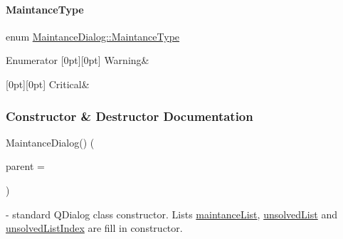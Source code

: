 \paragraph{\texorpdfstring{Maintance\+Type}{MaintanceType}}
{\footnotesize\ttfamily enum \mbox{\hyperlink{classMaintanceDialog_a0774fde5cbe916c333d8d1dd991a3b8f}{Maintance\+Dialog\+::\+Maintance\+Type}}}

\begin{DoxyEnumFields}{Enumerator}
[0pt][0pt]{}\mbox{\label{classMaintanceDialog_a0774fde5cbe916c333d8d1dd991a3b8fa8fe148a4b5ff71d3568fd6aff35d027e}} 
Warning&\\
\hline

[0pt][0pt]{}\mbox{\label{classMaintanceDialog_a0774fde5cbe916c333d8d1dd991a3b8fa56052452a2261539060f7f5433d35d61}} 
Critical&\\
\hline

\end{DoxyEnumFields}


\subsubsection{Constructor \& Destructor Documentation}
\mbox{\label{classMaintanceDialog_a3f541a92622740cce0a8f66e5de506fd}} 
{\footnotesize\ttfamily \texorpdfstring{Maintance\+Dialog()}{MaintanceDialog()}\hspace{0.1cm}{\footnotesize\ttfamily [1/2]} (\begin{DoxyParamCaption}\item[{Q\+Widget $\ast$}]{parent = {} }\end{DoxyParamCaption})\hspace{0.3cm}{\ttfamily [explicit]}} - standard Q\+Dialog class constructor. Lists \hyperlink{classMaintanceDialog_ac4eade50e2d9071c65adf44a2987fab1}{maintance\+List},  \hyperlink{classMaintanceDialog_a37e3caf05435d01f47ed488c39a91587}{unsolved\+List} and \hyperlink{classMaintanceDialog_aae5f5335ab6b848ea0ff6254abbcece3}{unsolved\+List\+Index} are fill in constructor. 

